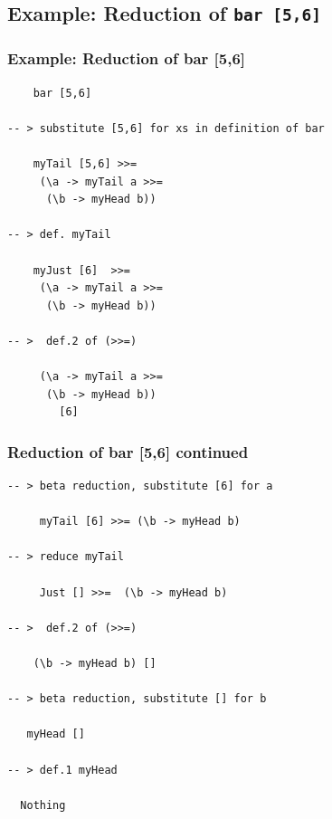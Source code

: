 \documentclass{beamer}
\begin{document}
\subsection{Example: Reduction of {\tt bar [5,6]}}
\begin{frame}[fragile]
\frametitle{Example: Reduction of bar [5,6]}

\begin{verbatim}
    bar [5,6]

-- > substitute [5,6] for xs in definition of bar

    myTail [5,6] >>=
     (\a -> myTail a >>=
      (\b -> myHead b))

-- > def. myTail

    myJust [6]  >>=
     (\a -> myTail a >>=
      (\b -> myHead b))

-- >  def.2 of (>>=)

     (\a -> myTail a >>=
      (\b -> myHead b))
        [6]
\end{verbatim}

\end{frame}

\begin{frame}[fragile]
\frametitle{Reduction of bar [5,6] continued}

\begin{verbatim}
-- > beta reduction, substitute [6] for a

     myTail [6] >>= (\b -> myHead b)

-- > reduce myTail

     Just [] >>=  (\b -> myHead b)

-- >  def.2 of (>>=)   

    (\b -> myHead b) []

-- > beta reduction, substitute [] for b

   myHead []

-- > def.1 myHead

  Nothing
\end{verbatim}

\end{frame}

\end{document}
